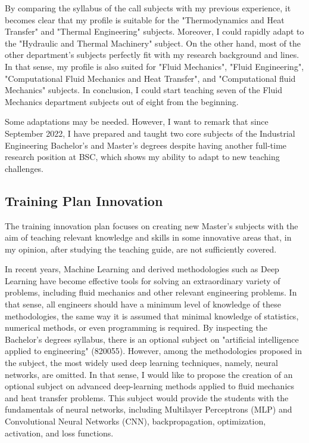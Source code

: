 \documentclass{article}
\begin{document}
By comparing the syllabus of the call subjects with my previous experience, it becomes clear that my profile is suitable for the "Thermodynamics and Heat Transfer" and "Thermal Engineering" subjects. Moreover, I could rapidly adapt to the "Hydraulic and Thermal Machinery" subject. On the other hand, most of the other department's subjects perfectly fit with my research background and lines. In that sense, my profile is also suited for "Fluid Mechanics", "Fluid Engineering", "Computational Fluid Mechanics and Heat Transfer", and "Computational fluid Mechanics" subjects. In conclusion, I could start teaching seven of the Fluid Mechanics department subjects out of eight from the beginning.     

Some adaptations may be needed. However, I want to remark that since September 2022, I have prepared and taught two core subjects of the Industrial Engineering Bachelor's and Master's degrees despite having another full-time research position at BSC, which shows my ability to adapt to new teaching challenges. 

\subsection{Training Plan Innovation}

The training innovation plan focuses on creating new Master's subjects with the aim of teaching relevant knowledge and skills in some innovative areas that, in my opinion, after studying the teaching guide, are not sufficiently covered.

In recent years, Machine Learning and derived methodologies such as Deep Learning have become effective tools for solving an extraordinary variety of problems, including fluid mechanics and other relevant engineering problems. In that sense, all engineers should have a minimum level of knowledge of these methodologies, the same way it is assumed that minimal knowledge of statistics, numerical methods, or even programming is required. By inspecting the Bachelor's degrees syllabus, there is an optional subject on "artificial intelligence applied to engineering" (820055). However, among the methodologies proposed in the subject, the most widely used deep learning techniques, namely, neural networks, are omitted. In that sense, I would like to propose the creation of an optional subject on advanced deep-learning methods applied to fluid mechanics and heat transfer problems. This subject would provide the students with the fundamentals of neural networks, including Multilayer Perceptrons (MLP) and Convolutional Neural Networks (CNN), backpropagation, optimization, activation, and loss functions.
\end{document}
